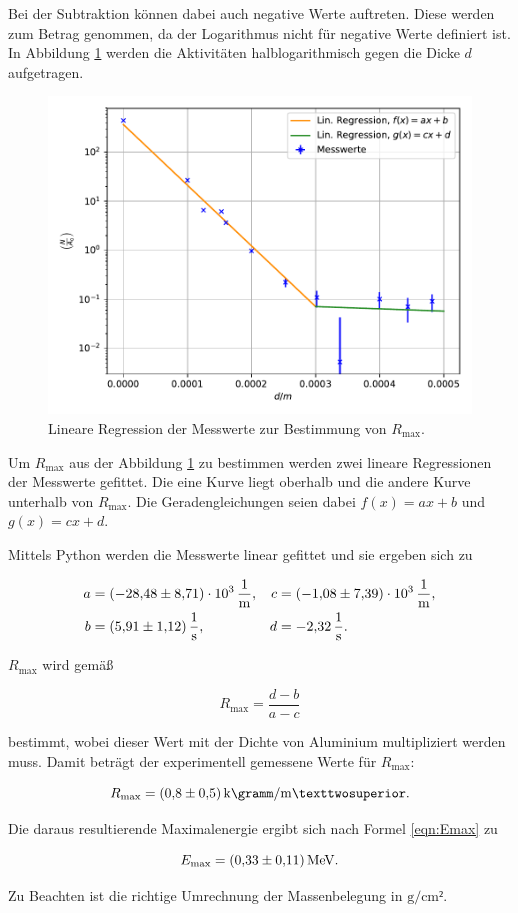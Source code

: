 Bei der Subtraktion können dabei auch negative Werte auftreten. Diese werden zum Betrag genommen, 
da der Logarithmus nicht für negative Werte definiert ist. 
In Abbildung \ref{fig:beta} werden die Aktivitäten halblogarithmisch gegen die Dicke $d$ aufgetragen. 

\begin{figure}
  \centering
  \includegraphics{beta.pdf}
  \caption{Lineare Regression der Messwerte zur Bestimmung von $R_\text{max}$.}
  \label{fig:beta}
\end{figure}

Um $R_\text{max}$ aus der Abbildung \ref{fig:beta} zu bestimmen werden zwei lineare Regressionen der 
Messwerte gefittet. Die eine Kurve liegt oberhalb und die andere Kurve unterhalb von $R_\text{max}$. 
Die Geradengleichungen seien dabei $f(x) = ax+b$ und $g(x) = cx+d$.

Mittels Python werden die Messwerte linear gefittet und sie ergeben sich zu 

\begin{align*}
a &= \SI{-28.48+-8.71e3}{\per\meter}, & c &= \SI{-1.08+-7.39e3}{\per\meter},\\
b &= \SI{5.91+-1.12}{\per\second}, & d &= \SI{-2.32}{\per\second}.
\end{align*}

$R_\text{max}$ wird gemäß 

\begin{equation*}
R_\text{max} = \frac{d-b}{a-c}
\end{equation*}

bestimmt, wobei dieser Wert mit der Dichte von Aluminium multipliziert werden muss. 
Damit beträgt der experimentell gemessene Werte für $R_\text{max}$:

\begin{equation*}
R_\text{max} = \SI{0.8+-0.5}{\kilo\gramm\per\meter²}.
\end{equation*}

Die daraus resultierende Maximalenergie ergibt sich nach Formel \eqref{eqn:Emax} zu 

\begin{equation*}
E_\text{max} = \SI{0.33+-0.11}{\mega\eV}.
\end{equation*}

Zu Beachten ist die richtige Umrechnung der Massenbelegung in $\si{\gram\per\centi\meter²}$.